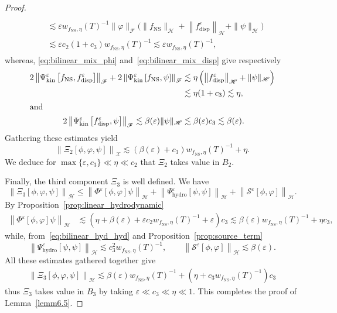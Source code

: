 \documentclass[10pt]{amsart}
\theoremstyle{definition}\newtheorem{defi}[theo]{Definition}\newtheorem{rema}[theo]{Remark}\newtheorem{exam}[theo]{Example}\newtheorem{exem}[theo]{Example}\newtheorem{nota}[theo]{Notation}
\newcommand{\ns}{\mathrm{NS}}
\newcommand{\hyd}{\mathrm{hydro}}
\newcommand{\kin}{\mathrm{kin}}
\newcommand{\disp}{\mathrm{disp}}
\renewcommand{\SS}{\mathcal{S}}
\newcommand{\FFF}{\mathscr{F}}
\newcommand{\HHH}{\mathscr{H}}
\newcommand{\GGG}{\mathscr{X}}
\newcommand{\SSSs}{\HHH}
\newcommand{\SSSl}{\GGG}
\newcommand{\SSSm}{\FFF}
\renewcommand*\le{\leqslant}
\newcommand*\eps{{\varepsilon}}
\begin{document}
\begin{proof}
\begin{multline*}
\\
\begin{aligned}
&\lesssim \eps w_{f_\ns, \eta}(T)^{-1} \| \varphi \|_{\SSSm}\bigg(\| f_\ns\|_{\SSSs} + \left\| f_\disp^\eps \right\|_{\SSSs} + \| \psi \|_{\SSSs}\bigg)\\
&\lesssim \eps c_2 (1 + c_3) w_{f_\ns, \eta}(T)^{-1} \lesssim \eps w_{f_\ns, \eta}(T)^{-1},
\end{aligned}
\end{multline*}
whereas, \eqref{eq:bilinear_mix_phi} and~\eqref{eq:bilinear_mix_disp} give respectively
\begin{align*}
2 \left\| \Psi^\eps_\kin\left[f_\ns, f^\eps_\disp \right] \right\|_{ \SSSm } + 2 \left\| \Psi^\eps_\kin\left[f_\ns, \psi \right] \right\|_{ \SSSm } & \lesssim \eta\left(\left\| f^\eps_\disp\right\|_{\SSSs} + \| \psi \|_{\SSSs}\right) \\
&\lesssim\eta (1+c_3) \lesssim \eta,
\\
\intertext{and}
2 \left\| \Psi^\eps_\kin\left[f^\eps_\disp, \psi \right] \right\|_{ \SSSm } \lesssim \beta(\eps)\| \psi\|_{\SSSs}
&\lesssim \beta(\eps) c_3 \lesssim \beta(\eps).
\end{align*}
Gathering these estimates yield
\[
\left\| \Xi_2\left[\phi, \varphi, \psi\right] \right\|_{\SSSl} \lesssim \left(\beta(\eps) + c_3\right) w_{f_\ns, \eta}(T)^{-1} + \eta.
\]
We deduce for $\max\{ \eps, c_3 \} \ll \eta \ll c_2$ that $\Xi_2$ takes value in $B_2$.

\vspace*{4pt}
Finally, the third component $\Xi_3$ is well defined. We have
\[
\left\| \Xi_3\left[\phi, \varphi, \psi\right]\right\|_{\SSSs} \le \left\| \Phi^\eps[\phi, \varphi] \psi \right\|_{\SSSs} + \left\| \Psi^\eps_\hyd [\psi, \psi] \right\|_{\SSSs} + \left\| \SS^\eps[\phi, \varphi] \right\|_{\SSSs}.
\]
By Proposition~\ref{prop:linear_hydrodynamic}
\begin{align*}
\left\| \Phi^\eps[\phi, \varphi] \psi \right\|_{\SSSs} & \lesssim \left(\eta + \beta(\eps) + \eps c_2 w_{f_\ns, \eta}(T)^{-1} + \eps \right) c_3 \lesssim \beta(\eps) w_{f_\ns, \eta}(T)^{-1} + \eta c_3,
\end{align*}
while, from~\eqref{eq:bilinear_hyd_hyd} and Proposition~\ref{prop:source_term}
\[
\left\| \Psi^\eps_\hyd [\psi, \psi] \right\|_{\SSSs} \lesssim c_3^2 w_{f_\ns, \eta}(T)^{-1}, \qquad \left\| \SS^\eps[\phi, \varphi] \right\|_{ \SSSs } \lesssim \beta(\eps).
\]
All these estimates gathered together give
\begin{align*}
\left\| \Xi_3[\phi, \varphi, \psi] \right\|_{\SSSs} \lesssim \beta(\eps) w_{ f_\ns, \eta }(T)^{-1} + \left(\eta + c_3 w_{ f_\ns, \eta }(T)^{-1} \right) c_3
\end{align*}
thus $\Xi_3$ takes value in $B_3$ by taking $\eps \ll c_3 \ll \eta \ll 1$. This completes the proof of Lemma~\ref{lemm6.5}.
\end{proof}
\end{document}
